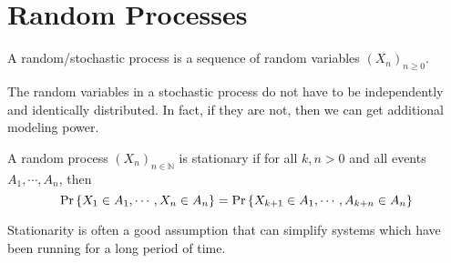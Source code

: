 \section{Random Processes}
\begin{definition}
	A random/stochastic process is a sequence of random variables $(X_n)_{n\geq 0}$.
	\label{defn:random-process}
\end{definition}
The random variables in a stochastic process do not have to be independently and identically distributed.
In fact, if they are not, then we can get additional modeling power.
\begin{definition}
	A random process $(X_n)_{n\in\mathbb{N}}$ is stationary if for all $k, n > 0$ and all events $A_1,\cdots,A_n$, then \[
		\text{Pr}\left\{X_1\in A_1,\cdots,X_n\in A_n\right\} = \text{Pr}\left\{X_{k+1}\in A_1,\cdots,A_{k+n}\in A_n\right\}
	\]
	\label{defn:stationarity}
\end{definition}
Stationarity is often a good assumption that can simplify systems which have been running for a long period of time.
